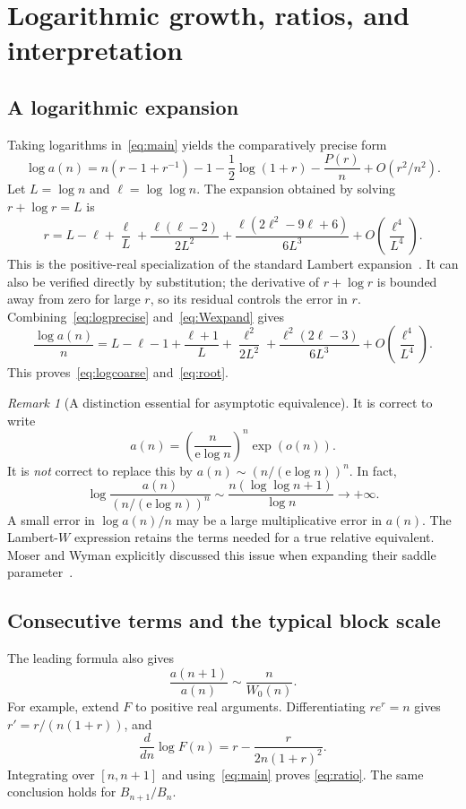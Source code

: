 \documentclass[11pt,a4paper]{article}
\numberwithin{equation}{section}
\theoremstyle{remark}
\newtheorem{remark}[theorem]{Remark}
\newcommand{\e}{\mathrm e}
\begin{document}
\section{Logarithmic growth, ratios, and interpretation}\label{sec:consequences}

\subsection{A logarithmic expansion}
Taking logarithms in~\eqref{eq:main} yields the comparatively precise form
\begin{equation}\label{eq:logprecise}
 \log a(n)=n(r-1+r^{-1})-1-\frac12\log(1+r)
          -\frac{P(r)}n+O(r^2/n^2).
\end{equation}
Let $L=\log n$ and $\ell=\log\log n$. The expansion obtained by solving
$r+\log r=L$ is
\begin{equation}\label{eq:Wexpand}
 r=L-\ell+\frac\ell L+\frac{\ell(\ell-2)}{2L^2}
   +\frac{\ell(2\ell^2-9\ell+6)}{6L^3}
   +O\!\left(\frac{\ell^4}{L^4}\right).
\end{equation}
This is the positive-real specialization of the standard Lambert
expansion~\cite{dlmf-w}. It can also be verified directly by substitution;
the derivative of $r+\log r$ is bounded away from zero for large $r$, so
its residual controls the error in $r$.
Combining~\eqref{eq:logprecise} and~\eqref{eq:Wexpand} gives
\begin{equation}\label{eq:logseries}
 \frac{\log a(n)}n
 =L-\ell-1+\frac{\ell+1}{L}
  +\frac{\ell^2}{2L^2}
  +\frac{\ell^2(2\ell-3)}{6L^3}
  +O\!\left(\frac{\ell^4}{L^4}\right).
\end{equation}
This proves~\eqref{eq:logcoarse} and~\eqref{eq:root}.

\begin{remark}[A distinction essential for asymptotic equivalence]
It is correct to write
\[
 a(n)=\left(\frac{n}{\e\log n}\right)^n\exp(o(n)).
\]
It is \emph{not} correct to replace this by
$a(n)\sim(n/(\e\log n))^n$. In fact,
\[
 \log\frac{a(n)}{(n/(\e\log n))^n}
 \sim\frac{n(\log\log n+1)}{\log n}\longrightarrow+\infty.
\]
A small error in $\log a(n)/n$ may be a large multiplicative error in
$a(n)$. The Lambert-$W$ expression retains the terms needed for a true
relative equivalent. Moser and Wyman explicitly discussed this issue
when expanding their saddle parameter~\cite[\S3]{moser-wyman}.
\end{remark}

\subsection{Consecutive terms and the typical block scale}
The leading formula also gives
\begin{equation}\label{eq:ratio}
 \frac{a(n+1)}{a(n)}\sim\frac{n}{W_0(n)}.
\end{equation}
For example, extend $F$ to positive real arguments. Differentiating
$re^r=n$ gives $r'=r/(n(1+r))$, and
\[
 \frac{d}{dn}\log F(n)
 =r-\frac{r}{2n(1+r)^2}.
\]
Integrating over $[n,n+1]$ and using~\eqref{eq:main} proves
\eqref{eq:ratio}. The same conclusion holds for $B_{n+1}/B_n$.
\end{document}
